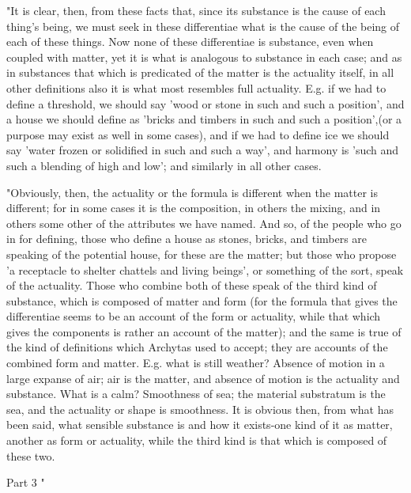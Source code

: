 "It is clear, then, from these facts that, since its substance is
the cause of each thing's being, we must seek in these differentiae
what is the cause of the being of each of these things. Now none of
these differentiae is substance, even when coupled with matter, yet
it is what is analogous to substance in each case; and as in substances
that which is predicated of the matter is the actuality itself, in
all other definitions also it is what most resembles full actuality.
E.g. if we had to define a threshold, we should say 'wood or stone
in such and such a position', and a house we should define as 'bricks
and timbers in such and such a position',(or a purpose may exist as
well in some cases), and if we had to define ice we should say 'water
frozen or solidified in such and such a way', and harmony is 'such
and such a blending of high and low'; and similarly in all other cases.

"Obviously, then, the actuality or the formula is different when the
matter is different; for in some cases it is the composition, in others
the mixing, and in others some other of the attributes we have named.
And so, of the people who go in for defining, those who define a house
as stones, bricks, and timbers are speaking of the potential house,
for these are the matter; but those who propose 'a receptacle to shelter
chattels and living beings', or something of the sort, speak of the
actuality. Those who combine both of these speak of the third kind
of substance, which is composed of matter and form (for the formula
that gives the differentiae seems to be an account of the form or
actuality, while that which gives the components is rather an account
of the matter); and the same is true of the kind of definitions which
Archytas used to accept; they are accounts of the combined form and
matter. E.g. what is still weather? Absence of motion in a large expanse
of air; air is the matter, and absence of motion is the actuality
and substance. What is a calm? Smoothness of sea; the material substratum
is the sea, and the actuality or shape is smoothness. It is obvious
then, from what has been said, what sensible substance is and how
it exists-one kind of it as matter, another as form or actuality,
while the third kind is that which is composed of these two.

Part 3 "

